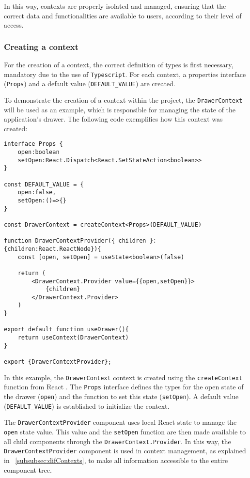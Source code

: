 In this way, contexts are properly isolated and managed, ensuring that the correct data and functionalities are available to users, according to their level of access.


\subsubsection{Creating a context}\label{subsubsec:contextCreation}
For the creation of a context, the correct definition of types is first necessary, mandatory due to the use of \texttt{Typescript}. For each context, a properties interface (\texttt{Props}) and a default value (\texttt{DEFAULT\_VALUE}) are created.

To demonstrate the creation of a context within the project, the \texttt{DrawerContext} will be used as an example, which is responsible for managing the state of the application's drawer. The following code exemplifies how this context was created:

\begin{Verbatim}[fontsize=\small, baselinestretch=0.8]
interface Props {
    open:boolean
    setOpen:React.Dispatch<React.SetStateAction<boolean>>
}

const DEFAULT_VALUE = {
    open:false,
    setOpen:()=>{}
}

const DrawerContext = createContext<Props>(DEFAULT_VALUE)

function DrawerContextProvider({ children }:{children:React.ReactNode}){
    const [open, setOpen] = useState<boolean>(false)

    return (
        <DrawerContext.Provider value={{open,setOpen}}>
            {children}
        </DrawerContext.Provider>
    )
}

export default function useDrawer(){
    return useContext(DrawerContext)
}

export {DrawerContextProvider};
\end{Verbatim}

In this example, the \texttt{DrawerContext} context is created using the \texttt{createContext} function from React \cite{reactCreateContext}. The \texttt{Props} interface defines the types for the open state of the drawer (\texttt{open}) and the function to set this state (\texttt{setOpen}). A default value (\texttt{DEFAULT\_VALUE}) is established to initialize the context.

The \texttt{DrawerContextProvider} component uses local React state to manage the \texttt{open} state value. This value and the \texttt{setOpen} function are then made available to all child components through the \texttt{DrawerContext.Provider}. In this way, the \texttt{DrawerContextProvider} component is used in context management, as explained in ~\ref{subsubsec:difContexts}, to make all information accessible to the entire component tree.

